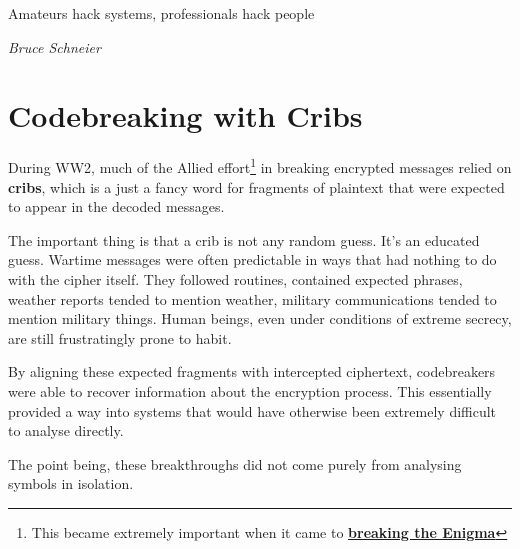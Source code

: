 \epigraph{Amateurs hack systems, professionals hack people}
{\textit{Bruce Schneier}}



\section{Codebreaking with Cribs}

During WW2, much of the Allied effort\footnote{This became extremely important when it came to \textbf{\href{https://en.wikipedia.org/wiki/Cryptanalysis_of_the_Enigma}{breaking the Enigma}}} in breaking encrypted messages relied on \textbf{cribs}, which is a just a fancy word for fragments of plaintext that were expected to appear in the decoded messages. 

The important thing is that a crib is not any random guess. It's an educated guess. Wartime messages were often predictable in ways that had nothing to do with the cipher itself. They followed routines, contained expected phrases, weather reports tended to mention weather, military communications tended to mention military things. Human beings, even under conditions of extreme secrecy, are still frustratingly prone to habit. 

By aligning these expected fragments with intercepted ciphertext, codebreakers were able to recover information about the encryption process. This essentially provided a way into systems that would have otherwise been extremely difficult to analyse directly. 

The point being, these breakthroughs did not come purely from analysing symbols in isolation. 


